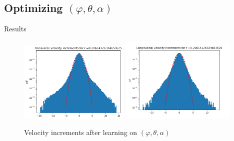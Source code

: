 \documentclass[11pt]{beamer}
\begin{document}
\subsection{Optimizing $(\varphi,\theta,\alpha)$}
\begin{frame}{Results}
  \begin{figure}
    \centering
    \includegraphics[width=0.47\textwidth]{illustrations/TransVelIncrAngles.png}
    \includegraphics[width=0.49\textwidth]{illustrations/LongVelIncrAngles.png}
    \caption{Velocity increments after learning on $(\varphi,\theta,\alpha)$}
  \end{figure}
\end{frame}
\end{document}
